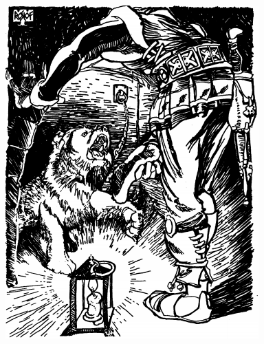 \documentclass[palace_of_the_silver_princess]{subfiles}
\begin{document}
\includegraphics[width=\columnwidth]{img/cave_bear.png}
\end{document}
